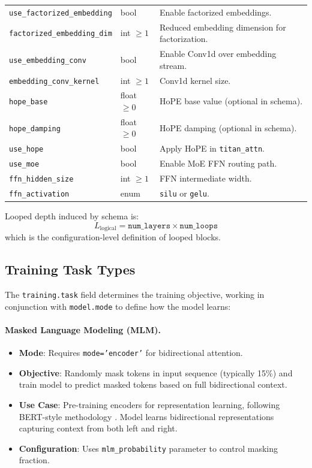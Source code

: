 \begin{longtable}{p{5.1cm}p{2.4cm}p{7.0cm}}
\texttt{use\_factorized\_embedding} & bool & Enable factorized embeddings. \\
\texttt{factorized\_embedding\_dim} & int $\ge 1$ & Reduced embedding dimension for factorization. \\
\texttt{use\_embedding\_conv} & bool & Enable Conv1d over embedding stream. \\
\texttt{embedding\_conv\_kernel} & int $\ge 1$ & Conv1d kernel size. \\
\texttt{hope\_base} & float $\ge 0$ & HoPE base value (optional in schema). \\
\texttt{hope\_damping} & float $\ge 0$ & HoPE damping (optional in schema). \\
\texttt{use\_hope} & bool & Apply HoPE in \texttt{titan\_attn}. \\
\texttt{use\_moe} & bool & Enable MoE FFN routing path. \\
\texttt{ffn\_hidden\_size} & int $\ge 1$ & FFN intermediate width. \\
\texttt{ffn\_activation} & enum & \texttt{silu} or \texttt{gelu}. \\
\bottomrule
\end{longtable}
\normalsize

Looped depth induced by schema is:
\[
L_{\text{logical}} = \texttt{num\_layers} \times \texttt{num\_loops}
\]
which is the configuration-level definition of looped blocks.

\subsection{Training Task Types}

The \texttt{training.task} field determines the training objective, working in conjunction with \texttt{model.mode} to define how the model learns:

\paragraph{Masked Language Modeling (MLM).}
\begin{itemize}[leftmargin=*]
    \item \textbf{Mode}: Requires \texttt{mode='encoder'} for bidirectional attention.
    \item \textbf{Objective}: Randomly mask tokens in input sequence (typically 15\%) and train model to predict masked tokens based on full bidirectional context.
    \item \textbf{Use Case}: Pre-training encoders for representation learning, following BERT-style methodology \citep{devlin_bert_2019}. Model learns bidirectional representations capturing context from both left and right.
    \item \textbf{Configuration}: Uses \texttt{mlm\_probability} parameter to control masking fraction.
\end{itemize}

